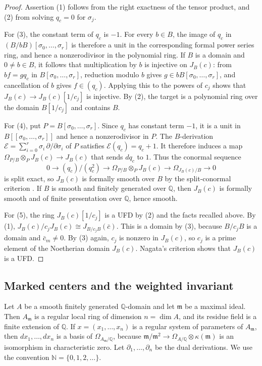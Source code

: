 \documentclass[11pt]{amsart}
\numberwithin{equation}{section}
\theoremstyle{definition}
\newcommand{\Q}{\mathbb{Q}}
\newcommand{\N}{\mathbb{N}}
\newcommand{\fm}{\mathfrak{m}}
\begin{document}
\begin{proof}
Assertion (1) follows from the right exactness of the tensor product, and (2) from solving $q_c=0$ for $\sigma_j$.

For (3), the constant term of $q_c$ is $-1$. For every $b\in B$, the image of $q_c$ in $(B/bB)[\sigma_0,\ldots,\sigma_r]$ is therefore a unit in the corresponding formal power series ring, and hence a nonzerodivisor in the polynomial ring. If $B$ is a domain and $0\ne b\in B$, it follows that multiplication by $b$ is injective on $J_B(c)$: from $bf=gq_c$ in $B[\sigma_0,\ldots,\sigma_r]$, reduction modulo $b$ gives $g\in bB[\sigma_0,\ldots,\sigma_r]$, and cancellation of $b$ gives $f\in(q_c)$. Applying this to the powers of $c_j$ shows that $J_B(c)\to J_B(c)[1/c_j]$ is injective. By (2), the target is a polynomial ring over the domain $B[1/c_j]$ and contains $B$.

For (4), put $P=B[\sigma_0,\ldots,\sigma_r]$. Since $q_c$ has constant term $-1$, it is a unit in $B[[\sigma_0,\ldots,\sigma_r]]$ and hence a nonzerodivisor in $P$. The $B$-derivation $\mathcal E=\sum_{i=0}^r\sigma_i\,\partial/\partial\sigma_i$ of $P$ satisfies $\mathcal E(q_c)=q_c+1$. It therefore induces a map $\Omega_{P/B}\otimes_P J_B(c)\to J_B(c)$ that sends $dq_c$ to $1$. Thus the conormal sequence
\[
  0\longrightarrow(q_c)/(q_c^2)\longrightarrow
  \Omega_{P/B}\otimes_P J_B(c)\longrightarrow\Omega_{J_B(c)/B}
  \longrightarrow0
\]
is split exact, so $J_B(c)$ is formally smooth over $B$ by the split-conormal criterion \cite[Tag~031J]{Stacks}. If $B$ is smooth and finitely generated over $\Q$, then $J_B(c)$ is formally smooth and of finite presentation over $\Q$, hence smooth.

For (5), the ring $J_B(c)[1/c_j]$ is a UFD by (2) and the facts recalled above. By (1), $J_B(c)/c_jJ_B(c)\cong J_{B/c_jB}(\bar c)$. This is a domain by (3), because $B/c_jB$ is a domain and $\bar c_m\ne0$. By (3) again, $c_j$ is nonzero in $J_B(c)$, so $c_j$ is a prime element of the Noetherian domain $J_B(c)$. Nagata's criterion shows that $J_B(c)$ is a UFD.
\end{proof}

\subsection{Marked centers and the weighted invariant}
Let $A$ be a smooth finitely generated $\Q$-domain and let $\fm$ be a maximal ideal. Then $A_\fm$ is a regular local ring of dimension $n=\dim A$, and its residue field is a finite extension of $\Q$. If $x=(x_1,\ldots,x_n)$ is a regular system of parameters of $A_\fm$, then $dx_1,\ldots,dx_n$ is a basis of $\Omega_{A_\fm/\Q}$, because $\fm/\fm^2\to\Omega_{A/\Q}\otimes\kappa(\fm)$ is an isomorphism in characteristic zero. Let $\partial_1,\ldots,\partial_n$ be the dual derivations. We use the convention $\N=\{0,1,2,\ldots\}$.
\end{document}
